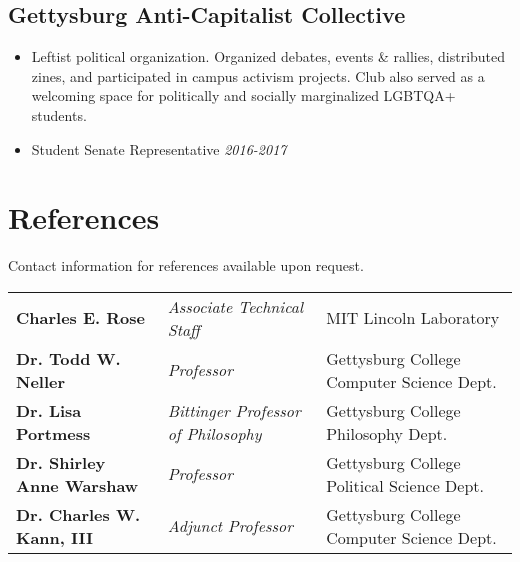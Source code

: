 \documentclass[11pt]{article}
\begin{document}
\subsection*{Gettysburg Anti-Capitalist Collective}
\begin{itemize}[noitemsep]
    \item Leftist political organization. Organized debates, events \& rallies, distributed zines, and participated in campus activism projects. Club also served as a welcoming space for politically and socially marginalized LGBTQA+ students. 
    \item Student Senate Representative \hfill \textit{2016-2017}
\end{itemize}


\section*{References}
Contact information for references available upon request. \\

\begin{tabular}{ l l l }
	\textbf{Charles E. Rose} & \textit{Associate Technical Staff} & MIT Lincoln Laboratory \\
	\textbf{Dr. Todd W. Neller} & \textit{Professor} & Gettysburg College Computer Science Dept. \\
	\textbf{Dr. Lisa Portmess} & \textit{Bittinger Professor of Philosophy} & Gettysburg College Philosophy Dept. \\
	\textbf{Dr. Shirley Anne Warshaw} & \textit{Professor} & Gettysburg College Political Science Dept. \\
	\textbf{Dr. Charles W. Kann, III} & \textit{Adjunct Professor} & Gettysburg College Computer Science Dept. \\
\end{tabular}
\end{document}
